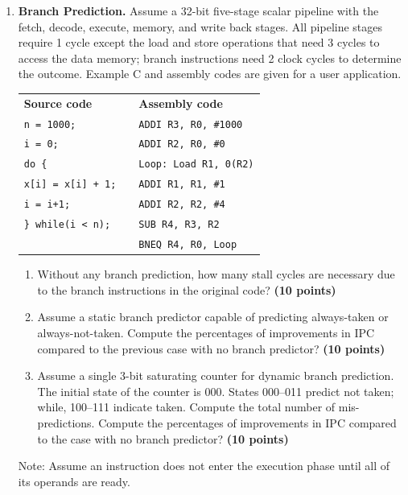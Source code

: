\documentclass[a4paper, 11pt]{exam}
\begin{document}
\begin{enumerate}
\item \textbf{Branch Prediction.}
Assume a 32-bit five-stage scalar pipeline with the fetch, decode, execute, memory, and write back stages.
All pipeline stages require 1 cycle except the load and store operations that need 3 cycles to access the data memory; branch instructions need 2 clock cycles to determine the outcome.
Example C and assembly codes are given for a user application.

\begin{tabular}{lll}
	\textbf{Source code} & & \textbf{Assembly code }\\
	\texttt{n = 1000;}&  &\hspace{40pt}\texttt{ADDI R3, R0, \#1000} \\
	\texttt{i = 0;} &  &\hspace{40pt}\texttt{ADDI R2, R0, \#0}\\
	\texttt{do \{} &  &\texttt{Loop: Load  R1, 0(R2)} \\
	\hspace{20pt}\texttt{x[i] = x[i] + 1;}&  &\hspace{40pt}\texttt{ADDI   R1, R1, \#1}\\
	\hspace{20pt}\texttt{i = i+1;}&  &\hspace{40pt}\texttt{ADDI R2, R2, \#4}\\
	\texttt{\} while(i < n);}&  &\hspace{40pt}\texttt{SUB R4, R3, R2}\\
	&  &\hspace{40pt}\texttt{BNEQ R4, R0, Loop}\\
\end{tabular}

\begin{enumerate}
	\item  Without any branch prediction, how many stall cycles are necessary due to the branch instructions in the original code? \textbf {(10 points)}
    \item  Assume a static branch predictor capable of predicting always-taken or always-not-taken. Compute the percentages of improvements in IPC compared to the previous case with no branch predictor? \textbf {(10 points)}
   \item Assume a single 3-bit saturating counter for dynamic branch prediction. The initial state of the counter is 000. States 000--011 predict not taken; while, 100--111 indicate taken. Compute the total number of mis-predictions. Compute the percentages of improvements in IPC compared to the case with no branch predictor? \textbf {(10 points)}
\end{enumerate}
Note: Assume an instruction does not enter the execution phase until all of its operands are ready.




\end{enumerate}
\end{document}
